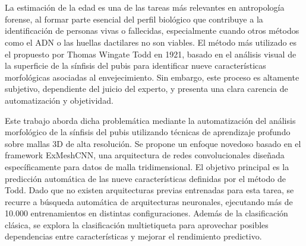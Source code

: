 \chapter*{}


%



\thispagestyle{empty}

\begin{center}
{\small \bfseries \myTitle}
\end{center}
\begin{center}
\myName
\end{center}



La estimación de la edad es una de las tareas más relevantes en antropología forense, al formar parte esencial del perfil biológico que contribuye a la identificación de personas vivas o fallecidas, especialmente cuando otros métodos como el ADN o las huellas dactilares no son viables. El método más utilizado es el propuesto por Thomas Wingate Todd en 1921, basado en el análisis visual de la superficie de la sínfisis del pubis para identificar nueve características morfológicas asociadas al envejecimiento. Sin embargo, este proceso es altamente subjetivo, dependiente del juicio del experto, y presenta una clara carencia de automatización y objetividad.

Este trabajo aborda dicha problemática mediante la automatización del análisis morfológico de la sínfisis del pubis utilizando técnicas de aprendizaje profundo sobre mallas 3D de alta resolución. Se propone un enfoque novedoso basado en el framework ExMeshCNN, una arquitectura de redes convolucionales diseñada específicamente para datos de malla tridimensional. El objetivo principal es la predicción automática de las nueve características definidas por el método de Todd. Dado que no existen arquitecturas previas entrenadas para esta tarea, se recurre a búsqueda automática de arquitecturas neuronales, ejecutando más de 10.000 entrenamientos en distintas configuraciones. Además de la clasificación clásica, se explora la clasificación multietiqueta para aprovechar posibles dependencias entre características y mejorar el rendimiento predictivo.

